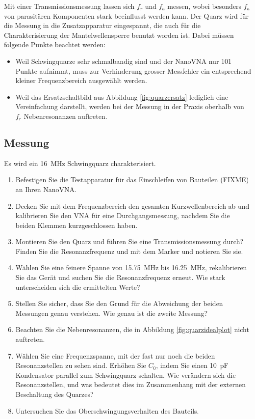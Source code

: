 \documentclass[twoside,a4paper,11pt,halfparskip,DIV=11,notitlepage]{scrartcl}
\begin{document}
Mit einer Transmissionsmessung lassen sich $f_r$ und $f_a$ messen, wobei besonders $f_a$ von parasitären Komponenten
stark beeinflusst werden kann. Der Quarz wird für die Messung in die Zusatzapparatur eingespannt, die auch für die
Charakterisierung der Mantelwellensperre benutzt worden ist. Dabei müssen folgende Punkte beachtet werden:

\begin{itemize}
    \item Weil Schwingquarze sehr schmalbandig sind und der NanoVNA nur 101 Punkte aufnimmt, muss zur Verhinderung grosser Messfehler ein entsprechend kleiner Frequenzbereich ausgewählt werden.
    \item Weil das Ersatzschaltbild aus Abbildung \ref{fig:quarzersatz} lediglich eine Vereinfachung darstellt, werden bei der Messung in der Praxis oberhalb von $f_r$ Nebenresonanzen auftreten.
\end{itemize}

\subsection{Messung}

Es wird ein 16~MHz Schwingquarz charakterisiert.

\begin{enumerate}
    \item Befestigen Sie die Testapparatur für das Einschleifen von Bauteilen (FIXME) an Ihren NanoVNA.
    \item Decken Sie mit dem Frequenzbereich den gesamten Kurzwellenbereich ab und kalibrieren Sie den VNA für eine
        Durchgangsmessung, nachdem Sie die beiden Klemmen kurzgeschlossen haben.
    \item Montieren Sie den Quarz und führen Sie eine Transmissionsmessung durch? Finden Sie die Resonanzfrequenz und
        mit dem Marker und notieren Sie sie.
    \item Wählen Sie eine feinere Spanne von 15.75~MHz bis 16.25~MHz,
        rekalibrieren Sie das Gerät und suchen Sie die Resonanzfrequenz erneut. Wie stark unterscheiden sich die ermittelten Werte?
    \item Stellen Sie sicher, dass Sie den Grund für die Abweichung der beiden Messungen genau verstehen. Wie genau ist die zweite Messung?
    \item Beachten Sie die Nebenresonanzen, die in Abbildung \ref{fig:quarzidealplot} nicht auftreten.
    \item Wählen Sie eine Frequenzspanne, mit der fast nur noch die beiden Resonanzstellen zu sehen sind. Erhöhen Sie $C_0$, indem Sie einen 10~pF Kondensator parallel zum Schwingquarz schalten. Wie verändern sich die Resonanzstellen, und was bedeutet dies im Zusammenhang mit der externen Beschaltung des Quarzes?
    \item Untersuchen Sie das Oberschwingungsverhalten des Bauteils.

\end{enumerate}
\end{document}
